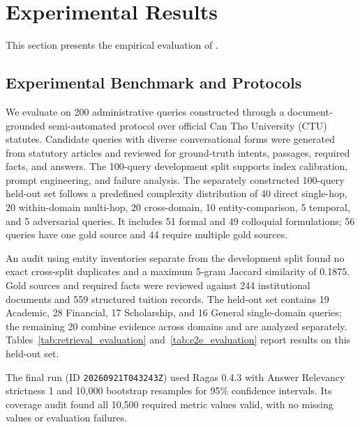 \section{Experimental Results}
\label{sec:exp}

This section presents the empirical evaluation of \system{}.

\subsection{Experimental Benchmark and Protocols}
\label{sec:dataset}

We evaluate \system{} on 200 administrative queries constructed through a document-grounded semi-automated protocol over official Can Tho University (CTU) statutes. Candidate queries with diverse conversational forms were generated from statutory articles and reviewed for ground-truth intents, passages, required facts, and answers. The 100-query development split supports index calibration, prompt engineering, and failure analysis. The separately constructed 100-query held-out set follows a predefined complexity distribution of 40 direct single-hop, 20 within-domain multi-hop, 20 cross-domain, 10 entity-comparison, 5 temporal, and 5 adversarial queries. It includes 51 formal and 49 colloquial formulations; 56 queries have one gold source and 44 require multiple gold sources.

An audit using entity inventories separate from the development split found no exact cross-split duplicates and a maximum 5-gram Jaccard similarity of 0.1875. Gold sources and required facts were reviewed against 244 institutional documents and 559 structured tuition records. The held-out set contains 19 Academic, 28 Financial, 17 Scholarship, and 16 General single-domain queries; the remaining 20 combine evidence across domains and are analyzed separately. Tables~\ref{tab:retrieval_evaluation} and~\ref{tab:e2e_evaluation} report results on this held-out set.

The final run (ID \texttt{20260921T043243Z}) used Ragas 0.4.3 with Answer Relevancy strictness 1 and 10,000 bootstrap resamples for 95\% confidence intervals. Its coverage audit found all 10,500 required metric values valid, with no missing values or evaluation failures.

